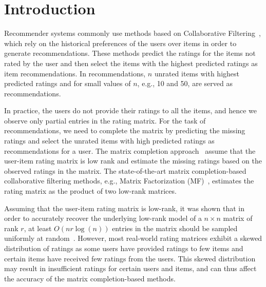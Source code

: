 \section{Introduction} \label{ch:matcomp:intro}


Recommender systems
commonly use methods based on Collaborative Filtering~\cite{SarwarKarypis01},
which rely on the
historical preferences of the users over items in order to generate
recommendations. 
These methods predict the ratings for the items not rated by
the user and then select the items with the highest predicted ratings as 
item recommendations.
In \TOPN recommendations, $n$ unrated items with highest predicted ratings and
for small values of $n$, e.g., 10 and 50, are
served as recommendations.

In practice, the users do not provide their ratings to all the items, and hence
we observe only partial entries in the rating matrix. For the task of
recommendations, we need to complete the matrix by predicting the missing
ratings and select the unrated items with high predicted ratings as
recommendations for a user.
The matrix completion approach~\cite{CandesRecht09} assume that the user-item rating matrix is low
rank and estimate the missing ratings based on the observed ratings in the matrix.
The state-of-the-art matrix completion-based collaborative filtering
methods, e.g., Matrix Factorization (MF)~\cite{Koren2009,
koren2008factorization, hu2008collaborative}, estimates the rating matrix as
the product of two low-rank matrices. 

\iffalse
\fi

Assuming that the user-item rating matrix is low-rank, it was
shown that in order to accurately recover the underlying low-rank model of a $n
\times n$ matrix of rank $r$, at least $O(nr \log(n))$ entries in the matrix
should be sampled uniformly at random~\cite{CandesTao2010, CandesRecht09}.
However, most real-world rating matrices exhibit a skewed distribution of
ratings as some users have provided ratings to few items and certain items have
received few ratings from the users. This skewed distribution may result in
insufficient ratings for certain users and items, and can thus affect the
accuracy of the matrix completion-based methods.

